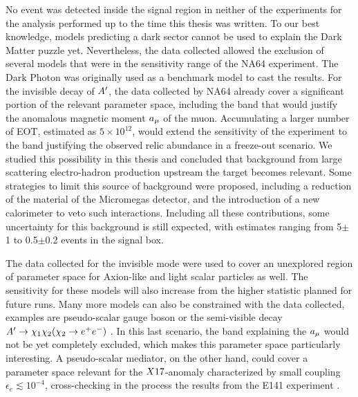 No event was detected inside the signal region in neither of the experiments for the analysis performed up to the time this thesis was written. To our best knowledge, models predicting a dark sector cannot be used to explain the Dark Matter puzzle yet. Nevertheless, the data collected allowed the exclusion of several models that were in the sensitivity range of the NA64 experiment. The Dark Photon was originally used as a benchmark model to cast the results. For the invisible decay of $A'$, the data collected by NA64 already cover a significant portion of the relevant parameter space, including the band that would justify the anomalous magnetic moment $a_{\mu}$ of the muon. Accumulating a larger number of EOT, estimated as $5 \times 10^{12}$, would extend the sensitivity of the experiment to the band justifying the observed relic abundance in a freeze-out scenario. We studied this possibility in this thesis and concluded that background from large scattering electro-hadron production upstream the target becomes relevant. Some strategies to limit this source of background were proposed, including a reduction of the material of the Micromegas detector, and the introduction of a new calorimeter to veto such interactions. Including all these contributions, some uncertainty for this background is still expected, with estimates ranging from 5$\pm$1 to 0.5$\pm$0.2 events in the signal box.

The data collected for the invisible mode were used to cover an unexplored region of parameter space for Axion-like and light scalar particles as well. The sensitivity for these models will also increase from the higher statistic planned for future runs. Many more models can also be constrained with the data collected, examples are pseudo-scalar gauge boson or the semi-visible decay $A' \to \chi_1 \chi_2 (\chi_2 \to e^+e^-)$ \cite{Mohlabeng_2019}. In this last scenario, the band explaining the $a_{\mu}$ would not be yet completely excluded, which makes this parameter space particularly interesting. A pseudo-scalar mediator, on the other hand, could cover a parameter space relevant for the $X17$-anomaly characterized by small coupling $\epsilon_e \lesssim 10^{-4}$, cross-checking in the process the results from the E141 experiment \cite{blum}.

